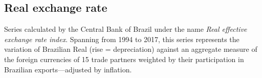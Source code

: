 \subsection{Real exchange rate}
Series calculated by the Central Bank of Brazil under the name \textit{Real effective exchange rate index}. Spanning from 1994 to 2017, this series represents the variation of Brazilian Real (rise = depreciation) against an aggregate measure of the foreign currencies of 15 trade partners weighted by their participation in Brazilian exports---adjusted by inflation.

